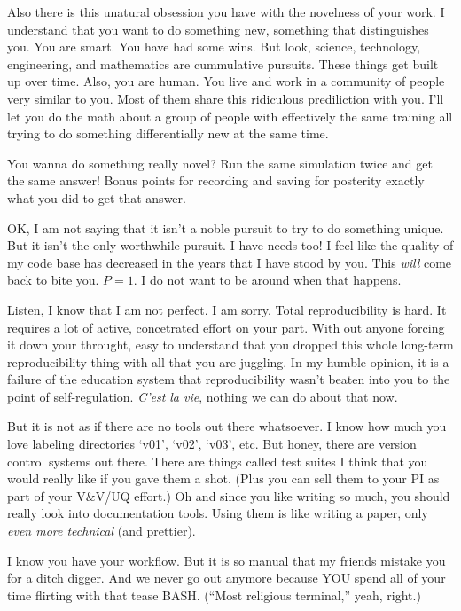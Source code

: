 \documentclass[final,10pt]{elsarticle}
\begin{document}
Also there is this unatural obsession you have with the novelness of your work.
I understand that you want to do something new, something that distinguishes you.
You are smart. You have had some wins.  But look, science, technology, engineering, 
and mathematics are cummulative pursuits.  These things get built up over time.
Also, you are human.  You live and work in a community of people very similar to you.  
Most of them share this ridiculous prediliction with you.  I'll let you do the math
about a group of people with effectively the same training all trying to do something
differentially new at the same time.

You wanna do something really novel?  Run the same simulation twice and get the same
answer!  Bonus points for recording and saving for posterity exactly what you did to
get that answer.

OK, I am not saying that it isn't a noble pursuit to try to do something unique.  
But it isn't the only worthwhile pursuit.  I have needs too!  I feel like the quality
of my code base has decreased in the years that I have stood by you.  This \emph{will}
come back to bite you.  $P=1$. I do not want to be around when that happens.

Listen, I know that I am not perfect.  I am sorry.  Total reproducibility is hard.
It requires a lot of active, concetrated effort on your part.  With out anyone 
forcing it down your throught, easy to understand that you dropped this whole 
long-term reproducibility thing with all that you are juggling.  In my humble 
opinion, it is a failure of the education system that reproducibility wasn't 
beaten into you to the point of self-regulation.  \emph{C'est la vie}, nothing we can 
do about that now.

But it is not as if there are no tools out there whatsoever.  I know how much you
love labeling directories `v01', `v02', `v03', etc.  But honey, there are version 
control systems out there.  There are things called test suites I think that you 
would really like if you gave them a shot.  (Plus you can sell them to your PI as 
part of your V\&V/UQ effort.)  Oh and since you like writing so much, you should 
really look into documentation tools.  Using them is like writing a paper, only
\emph{even more technical} (and prettier).

I know you have your workflow.  But it is so manual that my friends mistake you for
a ditch digger.  And we never go out anymore because YOU spend all of your time 
flirting with that tease BASH.  (``Most religious terminal,'' yeah, right.)
\end{document}
